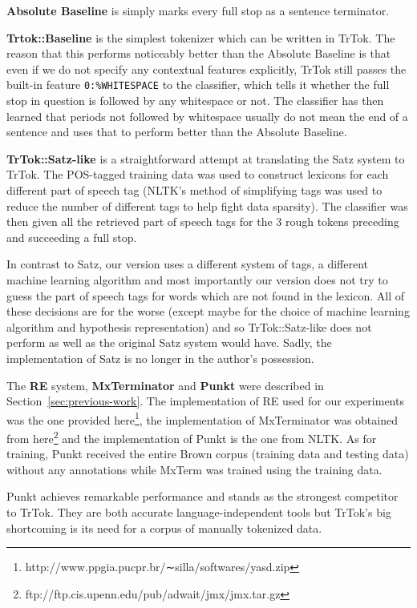 \textbf{Absolute Baseline} is simply marks every full stop as a
sentence terminator.

\textbf{Trtok::Baseline} is the simplest tokenizer which can be
written in TrTok. The reason that this performs noticeably better than
the Absolute Baseline is that even if we do not specify any contextual
features explicitly, TrTok still passes the built-in feature
\texttt{0:\%WHITESPACE} to the classifier, which tells it whether the
full stop in question is followed by any whitespace or not. The
classifier has then learned that periods not followed by whitespace
usually do not mean the end of a sentence and uses that to perform
better than the Absolute Baseline.

\textbf{TrTok::Satz-like} is a straightforward attempt at translating
the Satz system to TrTok. The POS-tagged training data was used to
construct lexicons for each different part of speech tag (NLTK's
method of simplifying tags was used to reduce the number of different
tags to help fight data sparsity). The classifier was then given all
the retrieved part of speech tags for the 3 rough tokens preceding and
succeeding a full stop.

In contrast to Satz, our version uses a different system of tags, a
different machine learning algorithm and most importantly our version
does not try to guess the part of speech tags for words which are not
found in the lexicon. All of these decisions are for the worse (except
maybe for the choice of machine learning algorithm and hypothesis
representation) and so TrTok::Satz-like does not perform as well as
the original Satz system would have. Sadly, the implementation of Satz
is no longer in the author's possession.

The \textbf{RE} system, \textbf{MxTerminator} and \textbf{Punkt} were
described in Section~\ref{sec:previous-work}. The implementation of RE
used for our experiments was the one provided
here\footnote{http://www.ppgia.pucpr.br/∼silla/softwares/yasd.zip},
the implementation of MxTerminator was obtained from
here\footnote{ftp://ftp.cis.upenn.edu/pub/adwait/jmx/jmx.tar.gz} and
the implementation of Punkt is the one from NLTK. As for training,
Punkt received the entire Brown corpus (training data and testing
data) without any annotations while MxTerm was trained using the
training data.

Punkt achieves remarkable performance and stands as the strongest
competitor to TrTok. They are both accurate language-independent tools
but TrTok's big shortcoming is its need for a corpus of manually
tokenized data.

